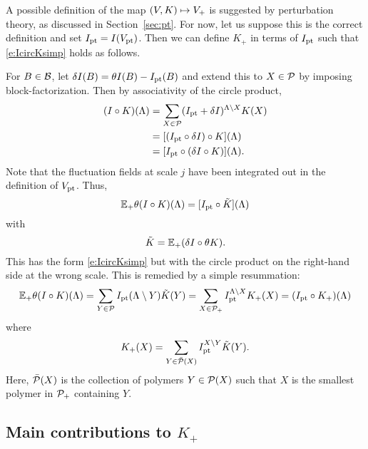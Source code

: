 A possible definition of the map $(V, K) \mapsto V_+$ is suggested by perturbation
theory, as discussed in Section~\ref{sec:pt}. For now, let us suppose this is
the correct definition and set $I_{\rm pt} = I(V_{\rm pt})$. Then we can define $K_+$ in terms
of $I_{\rm pt}$ such that \eqref{e:IcircKsimp} holds as follows.

For $B\in\mathcal{B}$, let $\delta I(B) = \theta I(B) - I_{\rm pt}(B)$ and extend this to $X\in\mathcal{P}$
by imposing block-factorization. Then by associativity of the circle product,
\begin{align}
(I \circ K)(\Lambda)
	&= \sum_{X\in\mathcal{P}} (I_{\rm pt} + \delta I)^{\Lambda \setminus X} K(X) \\
	&= [(I_{\rm pt} \circ \delta I) \circ K](\Lambda) \\
	&= [I_{\rm pt} \circ (\delta I \circ K)](\Lambda).
\end{align}
Note that the fluctuation fields at scale $j$ have been integrated out in the
definition of $V_{\rm pt}$. Thus,
\begin{equation}
\mathbb{E}_+ \theta(I \circ K)(\Lambda) = [I_{\rm pt} \circ \tilde K](\Lambda)
\end{equation}
with
\begin{equation}
\tilde K = \mathbb{E}_+ (\delta I \circ \theta K).
\end{equation}
This has the form \eqref{e:IcircKsimp} but with the circle product on the right-hand
side at the wrong scale. This is remedied by a simple resummation:
\begin{align}
\mathbb{E}_+ \theta (I \circ K)(\Lambda)
	= \sum_{Y\in\mathcal{P}} I_{\rm pt}(\Lambda \setminus Y) \tilde K(Y)
	= \sum_{X\in\mathcal{P}_+} I_{\rm pt}^{\Lambda \setminus X} K_+(X)
	= (I_{\rm pt} \circ K_+)(\Lambda)
\end{align}
where
\begin{equation}
\label{e:Kplus3}
K_+(X) = \sum_{Y \in \bar{\mathcal{P}}(X)} I_{\rm pt}^{X \setminus Y} \tilde K(Y).
\end{equation}
Here, $\bar{\mathcal{P}}(X)$ is the collection of polymers $Y\in\mathcal{P}(X)$ such that
$X$ is the smallest polymer in $\mathcal{P}_+$ containing $Y$.


\subsection{Main contributions to \texorpdfstring{$K_+$}{K+}}

